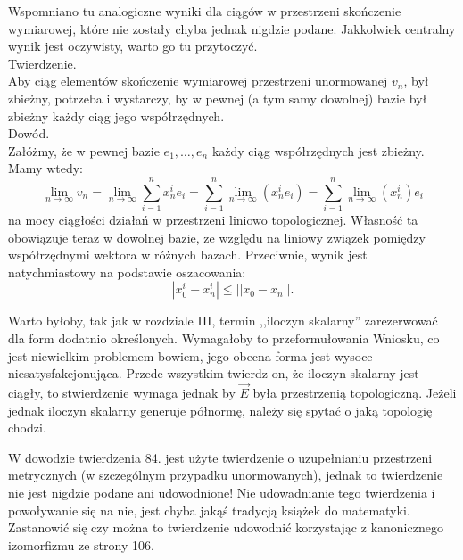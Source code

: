 \documentclass[a4paper,11pt]{article}
\begin{document}
\start {} Wspomniano tu analogiczne wyniki dla ciągów w
przestrzeni skończenie wymiarowej, które nie zostały chyba jednak
nigdzie podane. Jakkolwiek centralny wynik jest oczywisty, warto
go tu przytoczyć. \\
Twierdzenie. \\
Aby ciąg elementów skończenie wymiarowej przestrzeni unormowanej
$v_{ n }$, był zbieżny, potrzeba i wystarczy, by w pewnej (a tym samy
dowolnej) bazie był zbieżny każdy ciąg jego
współrzędnych. \\
Dowód. \\
Załóżmy, że w pewnej bazie $e_{ 1 }, \ldots, e_{ n }$ każdy ciąg
współrzędnych jest zbieżny. Mamy wtedy:
\begin{equation*}
  \lim_{ n \to \infty } v_{ n }
  = \lim_{ n \to \infty } \sum_{ i = 1 }^{ n } x_{ n }^{ i } e_{ i }
  = \sum_{ i = 1 }^{ n } \lim_{ n \to \infty }( x_{ n }^{ i } e_{ i } )
  = \sum_{ i = 1 }^{ n } \lim_{ n \to \infty }( x_{ n }^{ i } ) e_{ i }
\end{equation*}
na mocy ciągłości działań w przestrzeni liniowo topologicznej.
Własność ta obowiązuje teraz w dowolnej bazie, ze względu na liniowy
związek pomiędzy współrzędnymi wektora w różnych bazach. Przeciwnie,
wynik jest natychmiastowy na podstawie oszacowania:
$$| x_{ 0 }^{ i } - x_{ n }^{ i } | \leq || x_{ 0 } - x_{ n } ||\textrm{.}$$

\vspace{\spaceFour}


\start {} Warto byłoby, tak jak w rozdziale III, termin
,,iloczyn skalarny'' zarezerwować dla form dodatnio określonych.
Wymagałoby to przeformułowania Wniosku, co jest niewielkim problemem
bowiem, jego obecna forma jest wysoce niesatysfakcjonująca. Przede
wszystkim twierdz on, że iloczyn skalarny jest ciągły, to stwierdzenie
wymaga jednak by $\vec{ E }$ była przestrzenią topologiczną. Jeżeli
jednak iloczyn skalarny generuje półnormę, należy się spytać o jaką
topologię chodzi.

\vspace{\spaceFour}


\start {} W dowodzie twierdzenia 84. jest użyte twierdzenie o
uzupełnianiu przestrzeni metrycznych (w szczególnym przypadku
unormowanych), jednak to twierdzenie nie jest nigdzie podane ani
udowodnione! Nie udowadnianie tego twierdzenia i powoływanie się na
nie, jest chyba jakąś tradycją książek do matematyki. Zastanowić się
czy można to twierdzenie udowodnić korzystając z kanonicznego
izomorfizmu ze strony 106.
\end{document}
